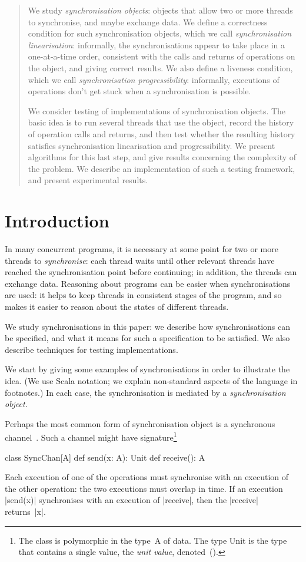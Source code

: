 \begin{abstract}
We study \emph{synchronisation objects}: objects that allow two or more
threads to synchronise, and maybe exchange data.  We define a correctness
condition for such synchronisation objects, which we call
\emph{synchronisation linearisation}: informally, the synchronisations appear
to take place in a one-at-a-time order, consistent with the calls and returns
of operations on the object, and giving correct results.  We also define a
liveness condition, which we call \emph{synchronisation progressibility}:
informally, executions of operations don't get stuck when a synchronisation is
possible.

We consider testing of implementations of synchronisation objects.  The basic
idea is to run several threads that use the object, record the history of
operation calls and returns, and then test whether the resulting history
satisfies synchronisation linearisation and progressibility.  We present
algorithms for this last step, and give results concerning the complexity of
the problem.  We describe an implementation of such a testing framework, and
present experimental results.
\end{abstract}

\section{Introduction}

In many concurrent programs, it is necessary at some point for two or more
threads to \emph{synchronise}: each thread waits until other relevant threads
have reached the synchronisation point before continuing; in addition, the
threads can exchange data.  Reasoning about programs can be easier when
synchronisations are used: it helps to keep threads in consistent stages of
the program, and so makes it easier to reason about the states of different
threads.

We study synchronisations in this paper: we describe how synchronisations can
be specified, and what it means for such a specification to be satisfied.  We
also describe techniques for testing implementations.

We start by giving some examples of synchronisations in order to illustrate
the idea.  (We use Scala notation; we explain non-standard aspects of the
language in footnotes.)  In each case, the synchronisation is mediated by a
\emph{synchronisation object}.

Perhaps the most common form of synchronisation object is a synchronous
channel~\cite{andrews,JCSP,sufrin:CSO}.  Such a channel might have
signature\footnote{The class is polymorphic in the type~{\scalashape A} of
  data.  The type {\scalashape Unit} is the type that contains a single value,
  the \emph{unit value}, denoted~{\scalashape ()}.}
%
\begin{scala}
class SyncChan[A]{
  def send(x: A): Unit
  def receive(): A
}
\end{scala}
%
Each execution of one of the operations must synchronise with an execution
of the other operation: the two executions must overlap in time.  If an
execution |send(x)| synchronises with an execution of |receive|, then the
|receive| returns~|x|.

